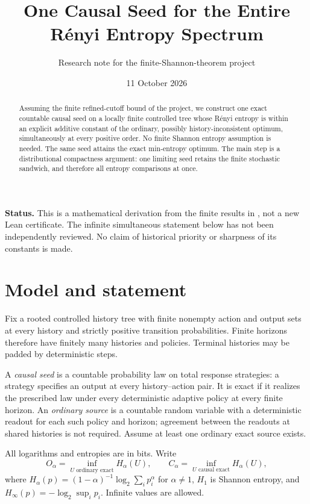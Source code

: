 \documentclass[11pt,a4paper]{article}
\title{\vspace{-12mm}One Causal Seed for the Entire\\ R\'enyi Entropy Spectrum}
\author{Research note for the finite-Shannon-theorem project}
\date{11 October 2026}
\begin{document}
\maketitle
\vspace{-5mm}
\begin{abstract}
Assuming the finite refined-cutoff bound of the project, we construct one
exact countable causal seed on a locally finite controlled tree whose
R\'enyi entropy is within an explicit additive constant of the ordinary,
possibly history-inconsistent optimum, simultaneously at every positive
order. No finite Shannon entropy assumption is needed. The same seed
attains the exact min-entropy optimum. The main step is a distributional
compactness argument: one limiting seed retains the finite stochastic
sandwich, and therefore all entropy comparisons at once.
\end{abstract}
\noindent\textbf{Status.} This is a mathematical derivation from the finite
results in \cite{repo}, not a new Lean certificate. The infinite simultaneous
statement below has not been independently reviewed. No claim of historical
priority or sharpness of its constants is made.

\section{Model and statement}
Fix a rooted controlled history tree with finite nonempty action and output
sets at every history and strictly positive transition probabilities.
Finite horizons therefore have finitely many histories and policies.
Terminal histories may be padded by deterministic steps.

A \emph{causal seed} is a countable probability law on total response
strategies: a strategy specifies an output at every history--action pair.
It is exact if it realizes the prescribed law under every deterministic
adaptive policy at every finite horizon. An \emph{ordinary source} is a
countable random variable with a deterministic readout for each such
policy and horizon; agreement between the readouts at shared histories is
not required. Assume at least one ordinary exact source exists.

All logarithms and entropies are in bits. Write
\[
 O_\alpha=\inf_{U\text{ ordinary exact}}H_\alpha(U),\qquad
 C_\alpha=\inf_{U\text{ causal exact}}H_\alpha(U),
\]
where $H_\alpha(p)=(1-\alpha)^{-1}\log_2\sum_i p_i^\alpha$ for
$\alpha\ne1$, $H_1$ is Shannon entropy, and
$H_\infty(p)=-\log_2\sup_i p_i$. Infinite values are allowed.
\end{document}
